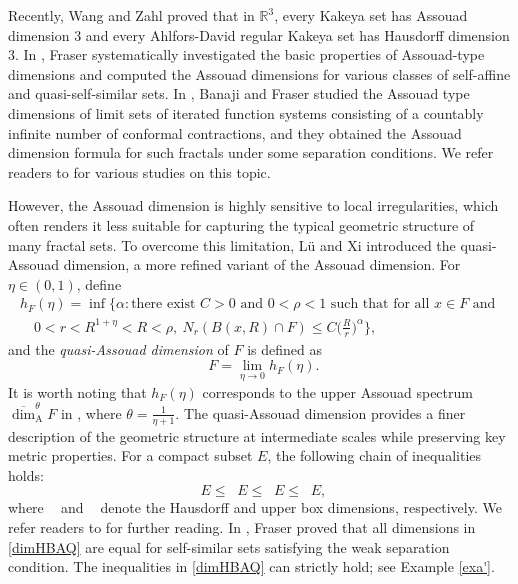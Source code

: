 \documentclass[12pt]{amsart}
\numberwithin{equation}{section}
\theoremstyle{plain}
\theoremstyle{remark}
\theoremstyle{definition}
\renewcommand{\le}{\leqslant}
\renewcommand{\leq}{\leqslant}
\DeclareMathOperator{\dimh}{dim_H}
\DeclareMathOperator{\odimb}{\overline{dim}_B}
\DeclareMathOperator{\dima}{dim_A}
\DeclareMathOperator{\dimqa}{dim_{qA}}
\begin{document}
Recently, Wang and Zahl \cite{WS25} proved that in $\mathbb{R}^{3}$, every Kakeya set has Assouad dimension $3$ and every Ahlfors-David regular Kakeya
set has Hausdorff dimension $3$. In \cite{Fraser14}, Fraser systematically investigated the basic properties of Assouad-type dimensions and computed the Assouad dimensions for various classes of self-affine and quasi-self-similar sets. In \cite{BF}, Banaji and Fraser studied  the Assouad type dimensions of limit sets of iterated function systems consisting of a countably infinite number of conformal contractions, and they obtained the Assouad dimension formula for such fractals under some separation conditions.  We refer readers to \cite{BKR,fraser2018assouad,FK23} for various studies on this topic. 

	
	However, the Assouad dimension is highly sensitive to local irregularities, which often renders it less suitable for capturing the typical geometric structure of many fractal sets. To overcome this limitation, Lü and Xi \cite{lu2016quasi} introduced the quasi-Assouad dimension, a more refined variant of the Assouad dimension. For $\eta\in (0,1)$, define
	\begin{eqnarray*}
		h_{F}(\eta)\!=\inf\Big\{\alpha:\text{there exist \ } C>0\text{\ and\ }0<\rho<1 \text{\ such that}
		\text{ for all\ } x\in F\text{\ and\ } \nonumber \\
		\quad 0<r<R^{1+\eta}<R<\rho,\  
		N_r(B(x,R)\cap F)\le C\Big(\frac Rr\Big)^{\alpha}
		\Big\},                      \label{def_hED}
	\end{eqnarray*} 
	and  the \emph{quasi-Assouad dimension}  of $F$ is defined as 
	\[
	\dimqa F=\lim_{\eta\to0}h_F(\eta).
	\]
	It is worth noting that $h_F(\eta)$ corresponds to the upper Assouad spectrum ${\overline{\dim}}^{\theta}_{\mathrm A}F$ in \cite{fraser2018assouad}, where $\theta=\frac1{\eta+1}$.
	The quasi-Assouad dimension provides a finer description of the geometric structure at intermediate scales while preserving key metric properties. For a compact subset $E$, the following chain of inequalities holds:
	\begin{equation} \label{dimHBAQ}
		\dimh E\leq \odimb E\le \dimqa E\le \dima E,
	\end{equation}
	where $\dimh$ and  $\odimb $ denote the Hausdorff and upper box dimensions, respectively. We refer readers to \cite{fraser2020assouad} for further reading. In \cite{fraser2015assouad}, Fraser proved that all dimensions in \eqref{dimHBAQ} are equal for self-similar sets satisfying the weak separation condition. The inequalities in \eqref{dimHBAQ} can strictly hold; see Example \ref{exa'}. 
	
\end{document}
